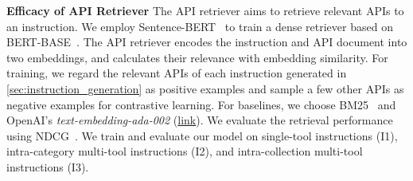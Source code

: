 \textbf{Efficacy of API Retriever} \quad
The API retriever aims to retrieve relevant APIs to an instruction. We employ Sentence-BERT~\citep{reimers2019sentence} to train a dense retriever based on BERT-BASE~\citep{devlin2018bert}. The API retriever encodes the instruction and API document into two embeddings, and 
calculates their relevance with embedding similarity. For training, we regard the relevant APIs of each instruction generated in \cref{sec:instruction_generation} as positive examples and sample a few other APIs as negative examples for contrastive learning.
For baselines, we choose BM25~\citep{robertson2009probabilistic} and OpenAI's \textit{text-embedding-ada-002} (\textcolor{blue}{\href{https://openai.com/blog/new-and-improved-embedding-model}{link}}). We evaluate the retrieval performance using NDCG~\citep{jarvelin2002cumulated}.
We train and evaluate our model on single-tool instructions (I1), intra-category multi-tool instructions (I2), and intra-collection multi-tool instructions (I3).





